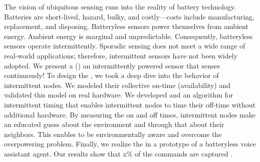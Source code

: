 The vision of ubiquitous sensing runs into the reality of battery technology. Batteries are short-lived, hazard, bulky, and costly---costs include manufacturing, replacement, and disposing. Batteryless sensors power themselves from ambient energy. Ambient energy is marginal and unpredictable. Consequently, batteryless sensors operate intermittently. Sporadic sensing does not meet a wide range of real-world applications; therefore, intermittent sensors have not been widely adopted. We present a \textit{\fullsys} (\sys) an intermittently powered sensor that senses continuously! To design the \sys, we took a deep dive into the behavior of intermittent nodes. We modeled their collective on-time (\sys availability) and validated this model on real hardware. We developed and an algorithm for intermittent timing that enables intermittent nodes to time their off-time without additional hardware. By measuring the on and off times, intermittent nodes make an educated guess about the environment and through that about their neighbors. This enables \sys to be environmentally aware and overcome the overpowering problem. Finally, we realize the \sys in a prototype of a batteryless voice assistant agent. Our results show that x\% of the commands are captured .
%
